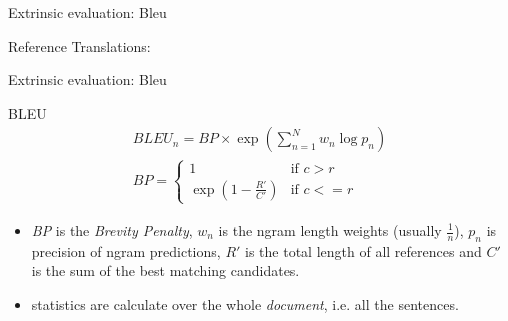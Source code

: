 \documentclass{beamer}
\begin{document}
\begin{frame}[t]{Extrinsic evaluation: Bleu}
\begin{block}{Reference Translations:}
\begin{enumerate}
  \end{enumerate}
\end{block}
\end{frame}

\begin{frame}[t]{Extrinsic evaluation: Bleu}
\begin{exampleblock}{BLEU}
\Large
\begin{align}
\nonumber BLEU_n = BP \times \exp{\left( \sum_{n=1}^{N} w_n \log{p_n} \right) }\\
\nonumber BP = \left\{ 
  \begin{array}{ll} 
    1 & \mbox{if $c > r$}  \\
    \exp{(1-\frac{R'}{C'})} & \mbox{if $c <= r$}
  \end{array} \right.
\end{align}
\end{exampleblock}
\begin{itemize}
\item {\em BP} is the {\em Brevity Penalty}, $w_n$ is the ngram length weights (usually $\frac{1}{n}$), $p_n$ is precision of ngram predictions, $R'$ is the total length of all references and $C'$ is the sum of the best matching candidates.
\item statistics are calculate over the whole {\em document}, i.e. all the sentences.
\end{itemize}
\end{frame}
\end{document}
